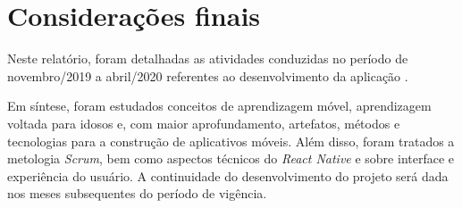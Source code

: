 \chapter{Considerações finais} \label{sec:conclusao}
Neste relatório, foram detalhadas as atividades conduzidas no período de novembro/2019 a abril/2020 referentes ao desenvolvimento da aplicação \crossword. 

Em síntese, foram estudados conceitos de aprendizagem móvel, aprendizagem voltada para idosos e, com maior aprofundamento, artefatos, métodos e tecnologias para a construção de aplicativos móveis. Além disso, foram tratados a metologia \textit{Scrum}, bem como aspectos técnicos do \textit{React Native} e sobre interface e experiência do usuário. A continuidade do desenvolvimento do projeto será dada nos meses subsequentes do período de vigência.